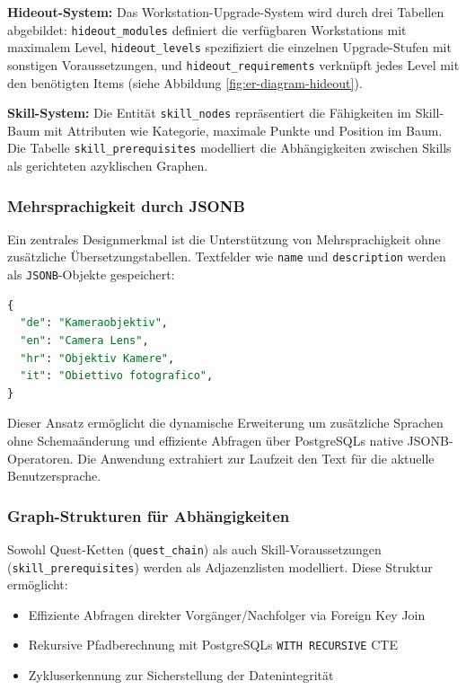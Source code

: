 \textbf{Hideout-System:} Das Workstation-Upgrade-System wird durch drei Tabellen abgebildet: \texttt{hideout\_modules} definiert die verfügbaren Workstations mit maximalem Level, \texttt{hideout\_levels} spezifiziert die einzelnen Upgrade-Stufen mit sonstigen Voraussetzungen, und \texttt{hideout\_requirements} verknüpft jedes Level mit den benötigten Items (siehe Abbildung \ref{fig:er-diagram-hideout}).

\textbf{Skill-System:} Die Entität \texttt{skill\_nodes} repräsentiert die Fähigkeiten im Skill-Baum mit Attributen wie Kategorie, maximale Punkte und Position im Baum. Die Tabelle \texttt{skill\_prerequisites} modelliert die Abhängigkeiten zwischen Skills als gerichteten azyklischen Graphen.

\subsubsection{Mehrsprachigkeit durch JSONB}

Ein zentrales Designmerkmal ist die Unterstützung von Mehrsprachigkeit ohne zusätzliche Übersetzungstabellen. Textfelder wie \texttt{name} und \texttt{description} werden als \texttt{JSONB}-Objekte gespeichert:

\begin{lstlisting}[language=SQL, caption={Mehrsprachige Textspeicherung in JSONB}]
{
  "de": "Kameraobjektiv",
  "en": "Camera Lens",
  "hr": "Objektiv Kamere",
  "it": "Obiettivo fotografico",
}
\end{lstlisting}

Dieser Ansatz ermöglicht die dynamische Erweiterung um zusätzliche Sprachen ohne Schemaänderung und effiziente Abfragen über PostgreSQLs native JSONB-Operatoren. Die Anwendung extrahiert zur Laufzeit den Text für die aktuelle Benutzersprache.

\subsubsection{Graph-Strukturen für Abhängigkeiten}

Sowohl Quest-Ketten (\texttt{quest\_chain}) als auch Skill-Voraussetzungen (\texttt{skill\_prerequisites}) werden als Adjazenzlisten modelliert. Diese Struktur ermöglicht:

\begin{itemize}
    \item Effiziente Abfragen direkter Vorgänger/Nachfolger via Foreign Key Join
    \item Rekursive Pfadberechnung mit PostgreSQLs \texttt{WITH RECURSIVE} \ac{CTE}
    \item Zykluserkennung zur Sicherstellung der Datenintegrität
\end{itemize}

